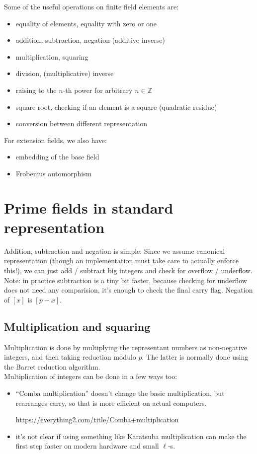 \documentclass[12pt,draft,a4paper,openany,oneside]{amsbook}
\def\Z{\mathbb{Z}}
\theoremstyle{plain}
\theoremstyle{definition}
\begin{document}
Some of the useful operations on finite field elements are:
\begin{itemize}
\item equality of elements, equality with zero or one
\item addition, subtraction, negation (additive inverse)
\item multiplication, squaring
\item division, (multiplicative) inverse
\item raising to the $n$-th power for arbitrary $n\in\Z$
\item square root, checking if an element is a square (quadratic residue)
\item conversion between different representation\\
\end{itemize}

For extension fields, we also have:
\begin{itemize}
\item embedding of the base field
\item Frobenius automorphism
\end{itemize}


\section{Prime fields in standard representation}

Addition, subtraction and negation is simple: Since we assume canonical representation
(though an implementation must take care to actually enforce this!), we can
just add / subtract big integers and check for overflow / underflow. Note:
in practice subtraction is a tiny bit faster, because checking for underflow
does not need any comparision, it's enough to check the final carry flag.
Negation of $[x]$ is $[p-x]$.

\subsection{Multiplication and squaring}
Multiplication is done by multiplying the representant numbers as non-negative 
integers, and then taking reduction modulo $p$.
The latter is normally done using the Barret reduction algorithm.\\

Multiplication of integers can be done in a few ways too:
\begin{itemize}
\item ``Comba multiplication'' doesn't change the basic multiplication, but
rearranges carry, so that is more efficient on actual computers.

\url{https://everything2.com/title/Comba+multiplication}
\item it's not clear if using something like Karatsuba multiplication can make
the first step faster on modern hardware and small $\ell$-s.\\
\end{itemize}
\end{document}
